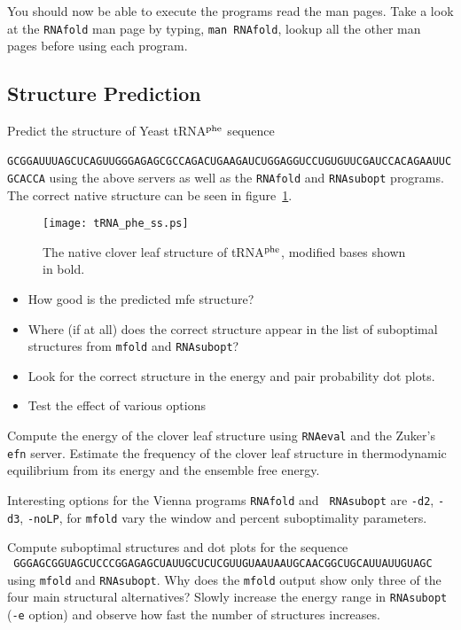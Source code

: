 \documentclass{article}
\begin{document}
You should now be able to execute the programs read the man pages. Take a
look at the {\tt RNAfold} man page by typing, {\tt man RNAfold}, lookup
all the other man pages before using each program.


\subsection{Structure Prediction}

Predict the structure of Yeast tRNA$^{\rm phe}$ sequence\\
{\small\tt
GCGGAUUUAGCUCAGUUGGGAGAGCGCCAGACUGAAGAUCUGGAGGUCCUGUGUUCGAUCCACAGAAUUCGCACCA}
using the above servers as well as the {\tt RNAfold} and {\tt RNAsubopt}
programs. The correct native structure can be seen in
figure~\ref{fig:tRNAsec}. 

\begin{figure}[ht]
\centerline{
\texttt{[image: tRNA\_phe\_ss.ps]}}
\caption{The native clover leaf structure of tRNA$^{\rm phe}$, modified
bases shown in bold.} 
\label{fig:tRNAsec}
\end{figure}

\begin{itemize}
\item How good is the predicted mfe structure?
\item Where (if at all) does the correct structure appear in the list of
suboptimal structures from {\tt mfold} and {\tt RNAsubopt}?
\item Look for the correct structure in the energy and pair probability
dot plots.
\item Test the effect of various options
\end{itemize}

Compute the energy of the clover leaf structure using {\tt RNAeval} and the
Zuker's {\tt efn} server. Estimate the frequency of the clover leaf
structure in thermodynamic equilibrium from its energy and the ensemble free
energy.

Interesting options for the Vienna programs {\tt RNAfold} and {\tt
RNAsubopt} are {\tt -d2}, {\tt -d3}, {\tt -noLP}, for {\tt mfold} vary the
window and percent suboptimality parameters.

Compute suboptimal structures and dot plots for the sequence\\
{\small\tt
GGGAGCGGUAGCUCCCGGAGAGCUAUUGCUCUCGUUGUAAUAAUGCAACGGCUGCAUUAUUGUAGC}\\
using {\tt mfold} and {\tt RNAsubopt}.
Why does the {\tt mfold} output show only three of the four main structural
alternatives? Slowly increase the energy range in {\tt RNAsubopt} ({\tt -e}
option) and observe how fast the number of structures increases.
\end{document}
